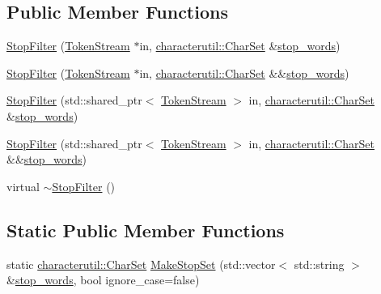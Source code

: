 \subsection*{Public Member Functions}
\begin{DoxyCompactItemize}
\item 
\mbox{\hyperlink{classlucene_1_1core_1_1analysis_1_1StopFilter_ac7db0ba3cf53a65d25442b1a2b290156}{Stop\+Filter}} (\mbox{\hyperlink{classlucene_1_1core_1_1analysis_1_1TokenStream}{Token\+Stream}} $\ast$in, \mbox{\hyperlink{classlucene_1_1core_1_1analysis_1_1characterutil_1_1CharSet}{characterutil\+::\+Char\+Set}} \&\mbox{\hyperlink{classlucene_1_1core_1_1analysis_1_1StopFilter_ace188f785bcebdc0f18a73116da1afd0}{stop\+\_\+words}})
\item 
\mbox{\hyperlink{classlucene_1_1core_1_1analysis_1_1StopFilter_a86879713f0135ab08a996e716f87aadb}{Stop\+Filter}} (\mbox{\hyperlink{classlucene_1_1core_1_1analysis_1_1TokenStream}{Token\+Stream}} $\ast$in, \mbox{\hyperlink{classlucene_1_1core_1_1analysis_1_1characterutil_1_1CharSet}{characterutil\+::\+Char\+Set}} \&\&\mbox{\hyperlink{classlucene_1_1core_1_1analysis_1_1StopFilter_ace188f785bcebdc0f18a73116da1afd0}{stop\+\_\+words}})
\item 
\mbox{\hyperlink{classlucene_1_1core_1_1analysis_1_1StopFilter_a49efaebf256d312e5fef43b7322c1e52}{Stop\+Filter}} (std\+::shared\+\_\+ptr$<$ \mbox{\hyperlink{classlucene_1_1core_1_1analysis_1_1TokenStream}{Token\+Stream}} $>$ in, \mbox{\hyperlink{classlucene_1_1core_1_1analysis_1_1characterutil_1_1CharSet}{characterutil\+::\+Char\+Set}} \&\mbox{\hyperlink{classlucene_1_1core_1_1analysis_1_1StopFilter_ace188f785bcebdc0f18a73116da1afd0}{stop\+\_\+words}})
\item 
\mbox{\hyperlink{classlucene_1_1core_1_1analysis_1_1StopFilter_ae2465c47647c009fd479ada9a7d2cb85}{Stop\+Filter}} (std\+::shared\+\_\+ptr$<$ \mbox{\hyperlink{classlucene_1_1core_1_1analysis_1_1TokenStream}{Token\+Stream}} $>$ in, \mbox{\hyperlink{classlucene_1_1core_1_1analysis_1_1characterutil_1_1CharSet}{characterutil\+::\+Char\+Set}} \&\&\mbox{\hyperlink{classlucene_1_1core_1_1analysis_1_1StopFilter_ace188f785bcebdc0f18a73116da1afd0}{stop\+\_\+words}})
\item 
virtual \mbox{\hyperlink{classlucene_1_1core_1_1analysis_1_1StopFilter_a78c7542a5cc8588d60babac01fa27eaf}{$\sim$\+Stop\+Filter}} ()
\end{DoxyCompactItemize}
\subsection*{Static Public Member Functions}
\begin{DoxyCompactItemize}
\item 
static \mbox{\hyperlink{classlucene_1_1core_1_1analysis_1_1characterutil_1_1CharSet}{characterutil\+::\+Char\+Set}} \mbox{\hyperlink{classlucene_1_1core_1_1analysis_1_1StopFilter_ac27f79322c5118e5ac408e250203e17e}{Make\+Stop\+Set}} (std\+::vector$<$ std\+::string $>$ \&\mbox{\hyperlink{classlucene_1_1core_1_1analysis_1_1StopFilter_ace188f785bcebdc0f18a73116da1afd0}{stop\+\_\+words}}, bool ignore\+\_\+case=false)
\end{DoxyCompactItemize}
